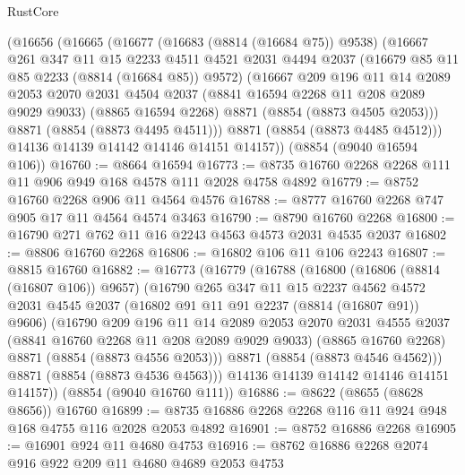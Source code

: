 \begin{lexlean}{RustCore}
\begin{coremodule}
    (@16656
      (@16665
        (@16677
          (@16683 (@8814 (@16684 @75)) @9538)
          (@16667
            @261
            @347
            @11
            @15
            @2233
            @4511
            @4521
            @2031
            @4494
            @2037
            (@16679 @85 @11 @85 @2233 (@8814 (@16684 @85)) @9572)
            (@16667
              @209
              @196
              @11
              @14
              @2089
              @2053
              @2070
              @2031
              @4504
              @2037
              (@8841 @16594 @2268 @11 @208 @2089 @9029 @9033)
              (@8865 @16594 @2268)
              @8871
              (@8854 (@8873 @4505 @2053)))
            @8871
            (@8854 (@8873 @4495 @4511)))
          @8871
          (@8854 (@8873 @4485 @4512)))
        @14136
        @14139
        @14142
        @14146
        @14151
        @14157))
    (@8854 (@9040 @16594 @106))
@16760 := @8664 @16594
@16773 := @8735 @16760 @2268 @2268 @111 @11 @906 @949 @168 @4578 @111 @2028 @4758 @4892
@16779 := @8752 @16760 @2268 @906 @11 @4564 @4576
@16788 := @8777 @16760 @2268 @747 @905 @17 @11 @4564 @4574 @3463
@16790 := @8790 @16760 @2268
@16800 := @16790 @271 @762 @11 @16 @2243 @4563 @4573 @2031 @4535 @2037
@16802 := @8806 @16760 @2268
@16806 := @16802 @106 @11 @106 @2243
@16807 := @8815 @16760
@16882 := @16773
    (@16779
      (@16788
        (@16800
          (@16806 (@8814 (@16807 @106)) @9657)
          (@16790
            @265
            @347
            @11
            @15
            @2237
            @4562
            @4572
            @2031
            @4545
            @2037
            (@16802 @91 @11 @91 @2237 (@8814 (@16807 @91)) @9606)
            (@16790
              @209
              @196
              @11
              @14
              @2089
              @2053
              @2070
              @2031
              @4555
              @2037
              (@8841 @16760 @2268 @11 @208 @2089 @9029 @9033)
              (@8865 @16760 @2268)
              @8871
              (@8854 (@8873 @4556 @2053)))
            @8871
            (@8854 (@8873 @4546 @4562)))
          @8871
          (@8854 (@8873 @4536 @4563)))
        @14136
        @14139
        @14142
        @14146
        @14151
        @14157))
    (@8854 (@9040 @16760 @111))
@16886 := @8622 (@8655 (@8628 @8656)) @16760
@16899 := @8735 @16886 @2268 @2268 @116 @11 @924 @948 @168 @4755 @116 @2028 @2053 @4892
@16901 := @8752 @16886 @2268
@16905 := @16901 @924 @11 @4680 @4753
@16916 := @8762 @16886 @2268 @2074 @916 @922 @209 @11 @4680 @4689 @2053 @4753

\end{coremodule}
\end{lexlean}
